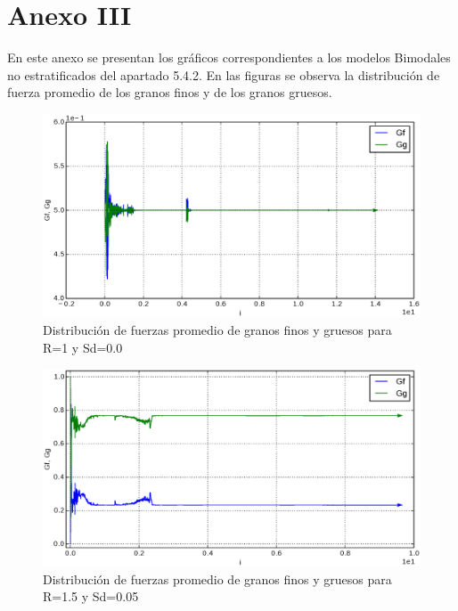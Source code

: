 \renewcommand{\appendixtocname}{Anexo III}
\appendix
\clearpage
 \addappheadtotoc %
\chapter*{ Anexo III} 
En este anexo se presentan los gr\'aficos correspondientes a los modelos Bimodales no estratificados del apartado 5.4.2. En las figuras se observa la distribuci\'on de fuerza promedio de los granos finos y de los granos gruesos.\\

\begin{figure}[htb]
\centering
\includegraphics[width=\textwidth]{Anexo2/PSD_10}
\caption{Distribuci\'on de fuerzas promedio de granos finos y gruesos para R=1 y Sd=0.0}
\label{fig:PSD10}
\end{figure}

\begin{figure}[htb]
\centering
\includegraphics[width=\textwidth]{Anexo2/PSD_15}
\caption{Distribuci\'on de fuerzas promedio de granos finos y gruesos para R=1.5 y Sd=0.05}
\label{fig:PSD15}
\end{figure}

